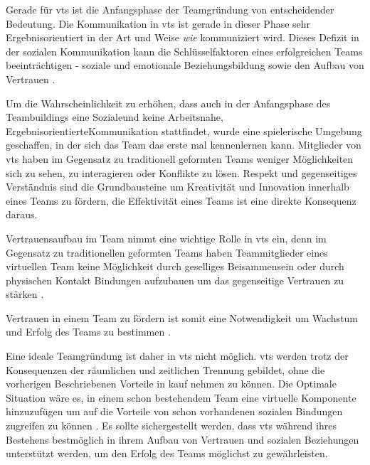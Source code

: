 \documentclass[a4paper,11pt]{article}%
\renewcommand{\\}{\vspace*{0.5\baselineskip} \newline}
\begin{document}

Gerade für \ac{vts} ist die Anfangsphase der Teamgründung von entscheidender Bedeutung. 
Die Kommunikation in \ac{vts} ist gerade in dieser Phase sehr Ergebnisorientiert in der Art und Weise \textit{wie} kommuniziert wird. Dieses Defizit in der sozialen Kommunikation kann die Schlüsselfaktoren eines erfolgreichen Teams beeinträchtigen - soziale und emotionale Beziehungsbildung sowie den Aufbau von Vertrauen \citep[p.378]{ren2007applying}.

Um die Wahrscheinlichkeit zu erhöhen, dass auch in der Anfangsphase des Teambuildings eine \glqq Soziale\grqq und keine \glqq Arbeitsnahe, Ergebnisorientierte\grqq Kommunikation stattfindet, wurde eine spielerische Umgebung geschaffen, in der sich das Team das erste mal kennenlernen kann. 
Mitglieder von \ac{vts} haben im Gegensatz zu traditionell geformten Teams weniger Möglichkeiten sich zu sehen, zu interagieren oder Konflikte zu lösen. 
Respekt und gegenseitiges Verständnis sind die Grundbausteine um Kreativität und Innovation innerhalb eines Teams zu fördern, die Effektivität eines Teams ist eine direkte Konsequenz daraus.

Vertrauensaufbau im Team nimmt eine wichtige Rolle in \ac{vts} ein, denn im Gegensatz zu traditionellen geformten Teams haben Teammitglieder eines virtuellen Team keine Möglichkeit durch geselliges Beisammensein oder durch physischen Kontakt Bindungen aufzubauen um das gegenseitige Vertrauen zu stärken \citep{TrustAndTheVirtualOrganisation}.

Vertrauen in einem Team zu fördern ist somit eine Notwendigkeit um Wachstum und Erfolg des Teams zu bestimmen \citep{glacel1997teamwork}.

Eine ideale Teamgründung ist daher in \ac{vts} nicht möglich. 
\ac{vts} werden trotz der Konsequenzen der räumlichen und zeitlichen Trennung gebildet, ohne die vorherigen Beschriebenen Vorteile in kauf nehmen zu können. Die Optimale Situation wäre es, in einem schon bestehendem Team eine virtuelle Komponente hinzuzufügen um auf die Vorteile von schon vorhandenen sozialen Bindungen zugreifen zu können \citep[p.36-37]{holton2001building}.
Es sollte sichergestellt werden, dass \ac{vts} während ihres Bestehens bestmöglich in ihrem Aufbau von Vertrauen und sozialen Beziehungen unterstützt werden, um den Erfolg des Teams möglichst zu gewährleisten.
\end{document}
